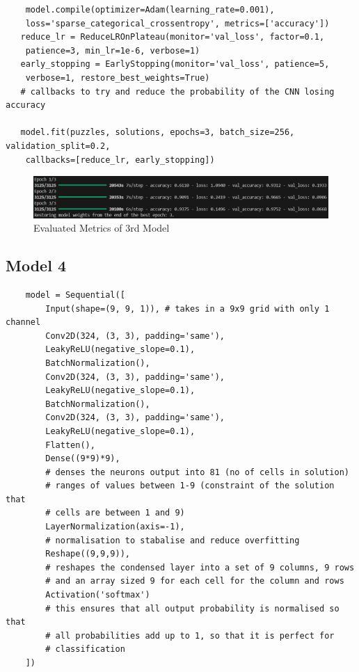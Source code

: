 \documentclass[]{final_report}
\begin{document}
\begin{verbatim}
    model.compile(optimizer=Adam(learning_rate=0.001), 
    loss='sparse_categorical_crossentropy', metrics=['accuracy'])
   reduce_lr = ReduceLROnPlateau(monitor='val_loss', factor=0.1, 
    patience=3, min_lr=1e-6, verbose=1)
   early_stopping = EarlyStopping(monitor='val_loss', patience=5, 
    verbose=1, restore_best_weights=True)
   # callbacks to try and reduce the probability of the CNN losing accuracy

   model.fit(puzzles, solutions, epochs=3, batch_size=256, validation_split=0.2,
    callbacks=[reduce_lr, early_stopping])
\end{verbatim}

\begin{figure}[ht]
    \centering 
    \begin{minipage}{1.1\textwidth} 
        \includegraphics[width=\textwidth]{images/3rd model metrics.png} 
        \caption{Evaluated Metrics of 3rd Model} 
        \label{fig: Evaluated Metrics of 3rd Model} 
    \end{minipage} 
    \hfill 
\end{figure}

\subsection{Model 4}

\begin{verbatim}
    model = Sequential([
        Input(shape=(9, 9, 1)), # takes in a 9x9 grid with only 1 channel
        Conv2D(324, (3, 3), padding='same'),
        LeakyReLU(negative_slope=0.1),
        BatchNormalization(),
        Conv2D(324, (3, 3), padding='same'),
        LeakyReLU(negative_slope=0.1),
        BatchNormalization(),
        Conv2D(324, (3, 3), padding='same'),
        LeakyReLU(negative_slope=0.1),
        Flatten(),
        Dense((9*9)*9),
        # denses the neurons output into 81 (no of cells in solution) 
        # ranges of values between 1-9 (constraint of the solution that 
        # cells are between 1 and 9)
        LayerNormalization(axis=-1),
        # normalisation to stabalise and reduce overfitting
        Reshape((9,9,9)),
        # reshapes the condensed layer into a set of 9 columns, 9 rows 
        # and an array sized 9 for each cell for the column and rows
        Activation('softmax')
        # this ensures that all output probability is normalised so that 
        # all probabilities add up to 1, so that it is perfect for 
        # classification
    ])
\end{verbatim}
\end{document}
